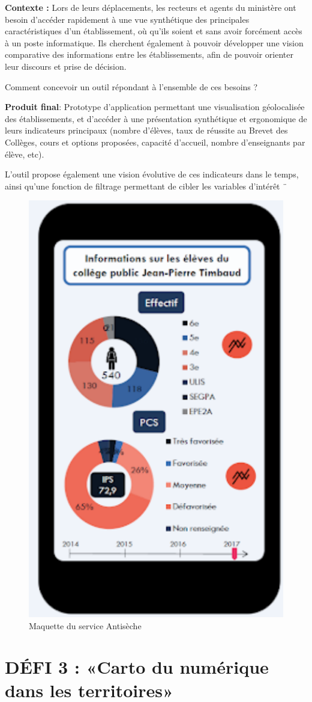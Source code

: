 \documentclass[]{book}
\begin{document}
\textbf{Contexte : } Lors de leurs déplacements, les recteurs et agents
du ministère ont besoin d'accéder rapidement à une vue synthétique des
principales caractéristiques d'un établissement, où qu'ils soient et
sans avoir forcément accès à un poste informatique. Ils cherchent
également à pouvoir développer une vision comparative des informations
entre les établissements, afin de pouvoir orienter leur discours et
prise de décision.

Comment concevoir un outil répondant à l'ensemble de ces besoins ?

\textbf{Produit final}: Prototype d'application permettant une
visualisation géolocalisée des établissements, et d'accéder à une
présentation synthétique et ergonomique de leurs indicateurs principaux
(nombre d'élèves, taux de réussite au Brevet des Collèges, cours et
options proposées, capacité d'accueil, nombre d'enseignants par élève,
etc).

L'outil propose également une vision évolutive de ces indicateurs dans
le temps, ainsi qu'une fonction de filtrage permettant de cibler les
variables d'intérêt ¨

\begin{figure}

{\centering \includegraphics[width=0.4\linewidth]{./img/antiseche} 

}

\caption{Maquette du service Antisèche}\label{fig:unnamed-chunk-10}
\end{figure}

\section{DÉFI 3 : «Carto du numérique dans les
territoires»}\label{defi-3-carto-du-numerique-dans-les-territoires}
\end{document}
